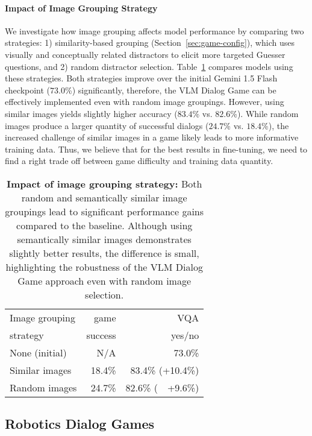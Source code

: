 \paragraph{Impact of Image Grouping Strategy}

We investigate how image grouping affects model performance by comparing two strategies: 1) similarity-based grouping (Section~\ref{sec:game-config}), which uses visually and conceptually related distractors to elicit more targeted Guesser questions, and 2) random distractor selection.
Table~\ref{tab:openimage_vqav2_grouping} compares models using these strategies. 
Both strategies improve over the initial Gemini 1.5 Flash checkpoint ($73.0$\%) significantly, therefore, the VLM Dialog Game can be effectively implemented even with random image groupings. 
However, using similar images yields slightly higher accuracy ($83.4$\% vs. $82.6$\%).
While random images produce a larger quantity of successful dialogs ($24.7$\% vs. $18.4$\%), the increased challenge of similar images in a game likely leads to more informative training data.
Thus, we believe that for the best results in fine-tuning, we need to find a right trade off between game difficulty and training data quantity.

\begin{table}[t]
    \centering
    \caption{\textbf{Impact of image grouping strategy:} Both random and semantically similar image groupings lead to significant performance gains compared to the baseline. Although using semantically similar images demonstrates slightly better results, the difference is small, highlighting the robustness of the VLM Dialog Game approach even with random image selection.}
    \vspace{5mm}
    \begin{tabular}{l|r|r}
      Image grouping & game & VQA \\
      strategy & success & yes/no \\
      \midrule
      None (initial) & N/A & 73.0\% \\
      Similar images & 18.4\% & 83.4\% (+10.4\%) \\
      Random images & 24.7\% & 82.6\% (~~+9.6\%) \\
    \end{tabular}
    \label{tab:openimage_vqav2_grouping}
\end{table}

\subsection{Robotics Dialog Games}
\label{sec:exps-robotics}

